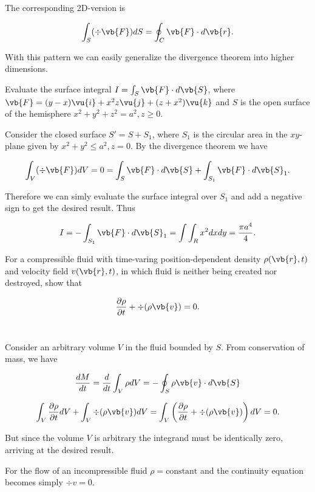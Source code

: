\documentclass[english,a4paper,12pt]{report}
\begin{document}
The corresponding 2D-version is 

\begin{equation}
	\int_{S}^{} (\div{\vb{F} } ) dS = \oint_{C} \vb{F} \cdot d\vb{r} . 
\end{equation}

With this pattern we can easily generalize the divergence theorem into higher dimensions. 

{Evaluate the surface integral \(I = \int_{S}^{} \vb{F} \cdot d\vb{S}  \), where \(\vb{F} = (y-x)\vu{i} + x^2z \vu{j} + (z+x^2) \vu{k}\) and \(S\) is the open surface of the hemisphere \(x^2 + y^2 + z^2 = a^2, z \ge 0\).}
{Consider the closed surface \(S' = S + S_1 \), where \(S_1 \) is the circular area in the \(xy\)-plane given by \(x^2 + y^2 \le a^2, z=0\). By the divergence theorem we have

\begin{equation}
	\int_{V}^{} (\div{\vb{F} } )dV = 0 = \int_{S}^{} \vb{F} \cdot d\vb{S} + \int_{S_1 }^{} \vb{F} \cdot d\vb{S}_{1} .  
\end{equation}

Therefore we can simly evaluate the surface integral over \(S_1 \) and add a negative sign to get the desired result. Thus

\begin{equation}
	I = - \int_{S_1 }^{} \vb{F} \cdot d\vb{S} _{1} = \int \int_{R}^{} x^2dxdy = \frac{\pi a^4}{4}.   
\end{equation}
} 

{For a compressible fluid with time-varing position-dependent density \(\rho (\vb{r}, t)\) and velocity field \(v(\vb{r}, t)\), in which fluid is neither being created nor destroyed, show that 

\begin{equation}
	\frac{\partial \rho }{\partial t} + \div{(\rho \vb{v} )} = 0.
\end{equation}~
}
{Consider an arbitrary volume \(V\) in the fluid bounded by \(S\). From conservation of mass, we have

\begin{equation}
	\frac{dM}{dt} = \frac{d}{dt} \int_{V}^{} \rho dV = - \oint_{S} \rho \vb{v} \cdot d\vb{S} 
\end{equation}

\begin{equation}
	\int_{V}^{} \frac{\partial \rho }{\partial t}dV + \int_{V}^{} \div{(\rho \vb{v} )} dV = \int_{V}^{} \left( \frac{\partial \rho }{\partial t} + \div{(\rho \vb{v} )}  \right) dV = 0.    
\end{equation}

But since the volume \(V\) is arbitrary the integrand must be identically zero, arriving at the desired result.

For the flow of an incompressible fluid \(\rho = \text{constant} \) and the continuity equation becomes simply \(\div{v} = 0\).~
}
\end{document}

